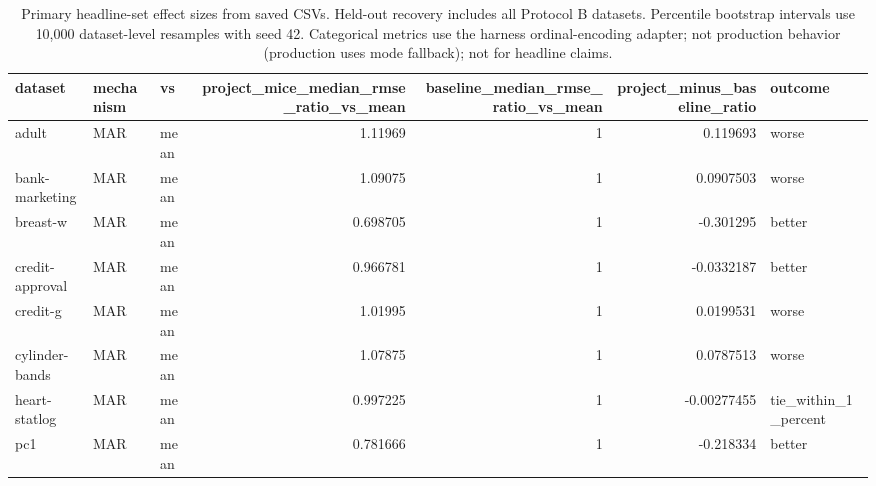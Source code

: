 \begin{table}[ht]
\centering
\caption{Primary headline-set effect sizes from saved CSVs. Held-out recovery includes all Protocol B datasets. Percentile bootstrap intervals use 10,000 dataset-level resamples with seed 42. Categorical metrics use the harness ordinal-encoding adapter; not production behavior (production uses mode fallback); not for headline claims.}
\label{tab:protocol_a_effect_sizes_by_dataset}
\begin{tabular}{lllrrrl}
\hline
 dataset              & mechanism   & vs               &   project\_mice\_median\_rmse\_ratio\_vs\_mean &   baseline\_median\_rmse\_ratio\_vs\_mean &   project\_minus\_baseline\_ratio & outcome              \\
\hline
 adult                & MAR         & mean             &                                 1.11969  &                             1        &                     0.119693   & worse                \\
 bank-marketing       & MAR         & mean             &                                 1.09075  &                             1        &                     0.0907503  & worse                \\
 breast-w             & MAR         & mean             &                                 0.698705 &                             1        &                    -0.301295   & better               \\
 credit-approval      & MAR         & mean             &                                 0.966781 &                             1        &                    -0.0332187  & better               \\
 credit-g             & MAR         & mean             &                                 1.01995  &                             1        &                     0.0199531  & worse                \\
 cylinder-bands       & MAR         & mean             &                                 1.07875  &                             1        &                     0.0787513  & worse                \\
 heart-statlog        & MAR         & mean             &                                 0.997225 &                             1        &                    -0.00277455 & tie\_within\_1\_percent \\
 pc1                  & MAR         & mean             &                                 0.781666 &                             1        &                    -0.218334   & better               \\

\end{tabular}
\end{table}
